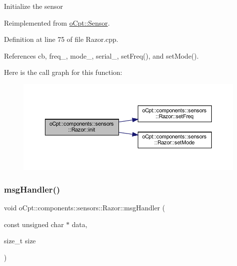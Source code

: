 Initialize the sensor 

Reimplemented from \hyperlink{classo_cpt_1_1_sensor_aa612a305a9a3091dd62cd1afb9d4dd7d}{o\+Cpt\+::\+Sensor}.



Definition at line 75 of file Razor.\+cpp.



References cb, freq\+\_\+, mode\+\_\+, serial\+\_\+, set\+Freq(), and set\+Mode().

Here is the call graph for this function\+:
\nopagebreak
\begin{figure}[H]
\begin{center}
\leavevmode
\includegraphics[width=350pt]{classo_cpt_1_1components_1_1sensors_1_1_razor_a1dd2b5a9fbac3c9510e2d3771abf358b_cgraph}
\end{center}
\end{figure}
\hypertarget{classo_cpt_1_1components_1_1sensors_1_1_razor_a8d8e051113a86789851faca74d3da303}{}\label{classo_cpt_1_1components_1_1sensors_1_1_razor_a8d8e051113a86789851faca74d3da303} 
\subsubsection{\texorpdfstring{msg\+Handler()}{msgHandler()}}
{\footnotesize\ttfamily void o\+Cpt\+::components\+::sensors\+::\+Razor\+::msg\+Handler (\begin{DoxyParamCaption}\item[{const unsigned char $\ast$}]{data,  }\item[{size\+\_\+t}]{size }\end{DoxyParamCaption})\hspace{0.3cm}{\ttfamily [private]}}




